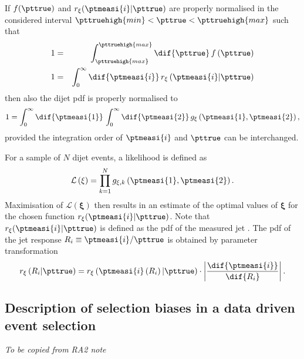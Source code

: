 If $f(\pttrue)$ and $r_{\mathbf{\xi}}(\ptmeasi{i}|\pttrue)$ are properly normalised in the considered interval \mbox{$\pttruehigh{min} < \pttrue < \pttruehigh{max}$} such that
\begin{eqnarray*}
  1 & = & \int^{\pttruehigh{max}}_{\pttruehigh{max}}\dif{\pttrue}\,f\left(\pttrue\right) \\
  1 & = & \int^{\infty}_{0}\dif{\ptmeasi{i}}\,r_{\mathbf{\xi}}\left(\ptmeasi{i}|\pttrue\right)
\end{eqnarray*}
then also the dijet pdf is properly normalised to
\begin{equation*}
  1 = \int^{\infty}_{0}\dif{\ptmeasi{1}}\,\int^{\infty}_{0}\dif{\ptmeasi{2}}\, g_{\mathbf{\xi}}\left(\ptmeasi{1},\ptmeasi{2}\right),
\end{equation*}
provided the integration order of $\ptmeasi{i}$ and $\pttrue$ can be interchanged.

For a sample of $N$ dijet events, a likelihood is defined as
\begin{equation}
  \label{eq:ResFit:Likelihood}
  \mathcal{L}\left(\mathbf{\xi}\right) = \prod^{N}_{k=1} g_{\mathbf{\xi},k}\left(\ptmeasi{1},\ptmeasi{2}\right).
\end{equation}
Maximisation of $\mathcal{L}(\mathbf{\xi})$ then results in an
estimate of the optimal values of $\mathbf{\xi}$ for the chosen
function $r_{\mathbf{\xi}}(\ptmeasi{i}|\pttrue)$.
Note that $r_{\mathbf{\xi}}(\ptmeasi{i}|\pttrue)$ is defined as the
pdf of the measured jet \pt.
The pdf of the jet \pt response \mbox{$R_{i}\equiv\ptmeasi{i} / \pttrue$} is obtained by parameter transformation
\begin{equation*}
  r_{\mathbf{\xi}}\left(R_{i}|\pttrue\right) =
  r_{\mathbf{\xi}}\left(\ptmeasi{i}\left(R_{i}\right)|\pttrue\right)\cdot\left|\frac{\dif{\ptmeasi{i}}}{\dif{R_{i}}}\right|.
\end{equation*}



\subsection{Description of selection biases in a data driven event selection}\label{sec:ResFit:Method:Biases}

\textit{To be copied from RA2 note}
